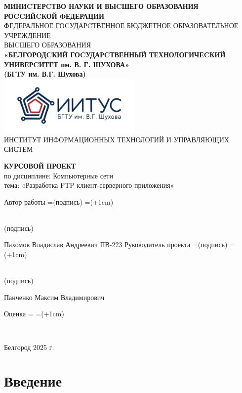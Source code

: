 \documentclass[a4paper,14pt]{extarticle}
\def\signature#1{%
    \setbox\namebox=\hbox{#1}
    \signboxdim=\dimexpr(\wd\namebox+1cm)
    \parbox[t]{\signboxdim}{%
        \centering
            \hrulefill\\    %
            #1
        \par}%
    }
\begin{document}
\linespread{1.5}
\justifying
\begin{center}
    \small{
        \textbf{МИНИCТЕРCТВО НАУКИ И ВЫCШЕГО ОБРАЗОВАНИЯ РОCCИЙCКОЙ ФЕДЕРАЦИИ}\\
        ФЕДЕРАЛЬНОЕ ГОCУДАРCТВЕННОЕ БЮДЖЕТНОЕ ОБРАЗОВАТЕЛЬНОЕ УЧРЕЖДЕНИЕ\\ВЫCШЕГО ОБРАЗОВАНИЯ \\
        \textbf{«БЕЛГОРОДCКИЙ ГОCУДАРCТВЕННЫЙ ТЕХНОЛОГИЧЕCКИЙ\\УНИВЕРCИТЕТ им. В. Г. ШУХОВА»\\ (БГТУ им. В.Г. Шухова)} \\
        \bigbreak
        \includegraphics[width=70mm]{log}\\
        ИНСТИТУТ ИНФОРМАЦИОННЫХ ТЕХНОЛОГИЙ И УПРАВЛЯЮЩИХ СИСТЕМ\\}
\end{center}

\vfill
\begin{center}
    \large{
        \textbf{
            КУРСОВОЙ ПРОЕКТ}}\\
    \normalsize{
        по дисциплине: Компьютерные сети \\
        тема: «Разработка FTP клиент-серверного приложения»}
\end{center}
\vfill
\begin{center}
    Автор работы \signature{\small{(подпись)}} Пахомов Владислав Андреевич ПВ-223\bigbreak
    Руководитель проекта \signature{\small{(подпись)}} Панченко Максим Владимирович
\end{center}
\vfill
\begin{center}
    Оценка \signature{}
\end{center}
\vfill\begin{center}
    Белгород 2025 г.
\end{center}
\newpage

\renewcommand{\contentsname}{Оглавление}
\thispagestyle{empty}
\tableofcontents
\newpage

\setlength{\parindent}{1.25cm}

\section{Введение}
\end{document}
